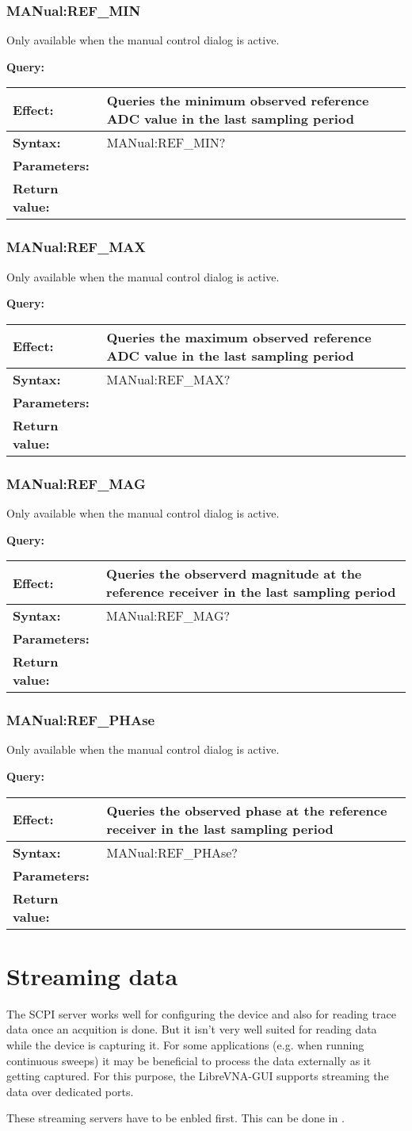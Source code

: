 \documentclass[a4paper,11pt]{article}
\newcommand{\query}[4]{
\noindent\textbf{Query:}
\begin{longtable}{p{.15\textwidth} | p{.80\textwidth} } 
\hline
\textbf{Effect:} & #1 \\ \hline
\textbf{Syntax:} & #2 \\ \hline 
\textbf{Parameters:} & \makecell[tl]{#3} \\ \hline
\textbf{Return value:} & \makecell[tl]{#4} \\ \hline
\end{longtable}
}
\begin{document}
\subsubsection{MANual:REF\_MIN}
Only available when the manual control dialog is active.

\query{Queries the minimum observed reference ADC value in the last sampling period}{MANual:REF\_MIN?}{None}{minimum ADC value}

\subsubsection{MANual:REF\_MAX}
Only available when the manual control dialog is active.

\query{Queries the maximum observed reference ADC value in the last sampling period}{MANual:REF\_MAX?}{None}{maximum ADC value}

\subsubsection{MANual:REF\_MAG}
Only available when the manual control dialog is active.

\query{Queries the observerd magnitude at the reference receiver in the last sampling period}{MANual:REF\_MAG?}{None}{port 1 magnitude (linear unit, arbitrary scale)}

\subsubsection{MANual:REF\_PHAse}
Only available when the manual control dialog is active.

\query{Queries the observed phase at the reference receiver in the last sampling period}{MANual:REF\_PHAse?}{None}{phase in degree (random value because it is relativ to an internal sampling clock)}

\section{Streaming data}
The SCPI server works well for configuring the device and also for reading trace data once an acquition is done. But it isn't very well suited for reading data while the device is capturing it. For some applications (e.g. when running continuous sweeps) it may be beneficial to process the data externally as it getting captured. For this purpose, the LibreVNA-GUI supports streaming the data over dedicated ports.

These streaming servers have to be enbled first. This can be done in .
\end{document}
